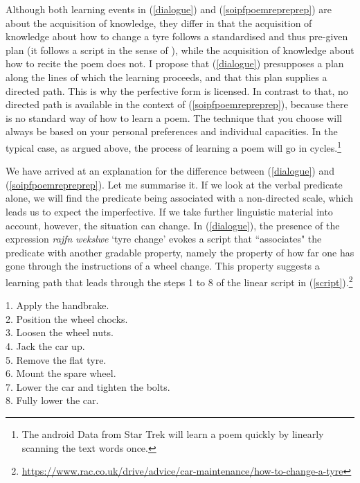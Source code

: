 \documentclass[output=paper,colorlinks,citecolor=brown]{langscibook}
\begin{document}

Although both learning events in (\ref{dialogue}) and (\ref{soipfpoemrepreprep}) are about the acquisition of knowledge, they differ in that the acquisition of knowledge about how to change a tyre follows a standardised and thus pre-given plan (it follows a script in the sense of \citealt{SchankAbel1977}), while the acquisition of knowledge about how to recite the poem does not.   
I propose that (\ref{dialogue}) presupposes a plan along the lines of which the learning proceeds, and that this plan supplies a directed path.
This is why the perfective form is licensed. In contrast to that, no directed path is available in the context of (\ref{soipfpoemrepreprep}), because there is no standard way of how to learn a poem. The technique that you choose will always be based on your personal preferences and individual capacities. In the typical case, as argued above, the process of learning a poem will go in cycles.\footnote{The android Data from Star Trek will learn a poem quickly by linearly scanning the text words once.}  

We have arrived at an explanation for the difference between (\ref{dialogue}) and (\ref{soipfpoemrepreprep}). Let me summarise it. If we look at the verbal predicate alone, we will find the predicate being associated with a non-directed scale, which leads us to expect the imperfective. If we take further linguistic material into account, however, the situation can change. In (\ref{dialogue}), the presence of the expression \textit{rajfn wekslwe} `tyre change' evokes a script that ``associates" the predicate with another gradable property, namely the property of how far one has gone through the instructions of a wheel change. This property suggests a learning path that leads through the steps 1 to 8 of the linear script in (\ref{script}).\footnote{\url{https://www.rac.co.uk/drive/advice/car-maintenance/how-to-change-a-tyre}}

  \ea\label{script}
1. Apply the handbrake.\\
2. Position the wheel chocks.\\
3. Loosen the wheel nuts.\\
4. Jack the car up.\\
5. Remove the flat tyre.\\
6. Mount the spare wheel.\\
7. Lower the car and tighten the bolts.\\
8. Fully lower the car.
\z
\end{document}
